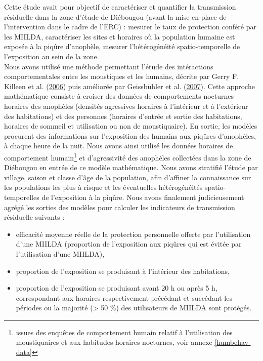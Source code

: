 \documentclass[12pt,twoside]{reedthesis}
\providecommand{\tightlist}{%
  \setlength{\itemsep}{0pt}\setlength{\parskip}{0pt}}
\begin{document}
Cette étude avait pour objectif de caractériser et quantifier la transmission résiduelle dans la zone d'étude de Diébougou (avant la mise en place de l'intervention dans le cadre de l'ERC) : mesurer le taux de protection conféré par les MIILDA, caractériser les sites et horaires où la population humaine est exposée à la piqûre d'anophèle, mesurer l'hétérogénéité spatio-temporelle de l'exposition au sein de la zone.\\

Nous avons utilisé une méthode permettant l'étude des intéractions comportementales entre les moustiques et les humains, décrite par Gerry F. Killeen et al. (\protect\hyperlink{ref-killeen_quantifying_2006}{2006}) puis améliorée par Geissbühler et al. (\protect\hyperlink{ref-geissbuhler_interdependence_2007}{2007}). Cette approche mathématique consiste à croiser des données de comportements nocturnes horaires des anophèles (densités agressives horaires à l'intérieur et à l'extérieur des habitations) et des personnes (horaires d'entrée et sortie des habitations, horaires de sommeil et utilisation ou non de moustiquaire). En sortie, les modèles procurent des informations sur l'exposition des humains aux piqûres d'anophèles, à chaque heure de la nuit. Nous avons ainsi utilisé les données horaires de comportement humain\footnote{issues des enquêtes de comportement humain relatif à l'utilisation des moustiquaires et aux habitudes horaires nocturnes, voir annexe \ref{humbehav-data}} et d'agressivité des anophèles collectées dans la zone de Diébougou en entrée de ce modèle mathématique. Nous avons stratifié l'étude par village, saison et classe d'âge de la population, afin d'affiner la connaissance sur les populations les plus à risque et les éventuelles hétérogénéités spatio-temporelles de l'exposition à la piqûre. Nous avons finalement judicieusement agrégé les sorties des modèles pour calculer les indicateurs de transmission résiduelle suivants :
\begin{itemize}
\tightlist
\item
  efficacité moyenne réelle de la protection personnelle offerte par l'utilisation d'une MIILDA (proportion de l'exposition aux piqûres qui est évitée par l'utilisation d'une MIILDA),
\item
  proportion de l'exposition se produisant à l'intérieur des habitations,
\item
  proportion de l'exposition se produisant avant 20 h ou après 5 h, correspondant aux horaires respectivement précédant et succédant les périodes ou la majorité (\textgreater{} 50 \%) des utilisateurs de MIILDA sont protégés.\\
\end{itemize}
\end{document}

